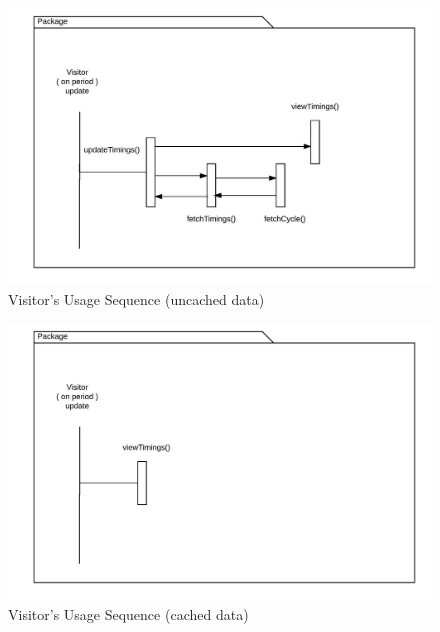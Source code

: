 \documentclass[12pt,a4paper,final]{report}
\begin{document}
	\begin{figure}[!h]
		\begin{center}
			\includegraphics[scale=0.6]{Diagrams/Old Diagrams/User_Uncached_Sequence.jpeg}
		\end{center}
		\caption{Visitor's Usage Sequence (uncached data)}
	\end{figure}
	\begin{figure}[!h]
		\begin{center}
			\includegraphics[scale=0.6]{Diagrams/Old Diagrams/User_Cached_Sequence.jpeg}
		\end{center}
		\caption{Visitor's Usage Sequence (cached data)}
	\end{figure}
\newpage
\end{document}
